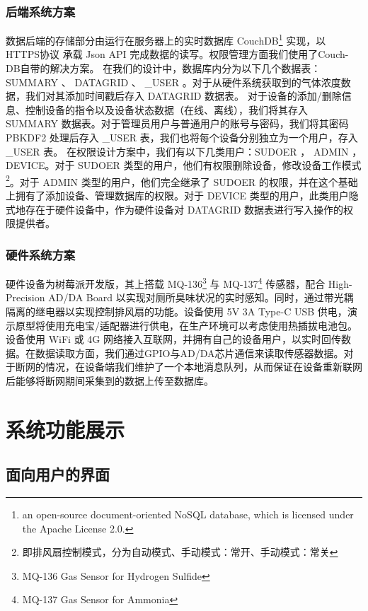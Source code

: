 \documentclass[degree=course]{sjtuthesis}
\begin{document}
\subsection{后端系统方案}
数据后端的存储部分由运行在服务器上的实时数据库 CouchDB\footnote{an open-source document-oriented NoSQL database, which is licensed under the Apache License 2.0.} 实现，以 HTTPS协议 承载 Json API 完成数据的读写。权限管理方面我们使用了Couch-DB自带的解决方案。
在我们的设计中，数据库内分为以下几个数据表： SUMMARY 、 DATAGRID 、 \_USER 。对于从硬件系统获取到的气体浓度数据，我们对其添加时间戳后存入 DATAGRID 数据表。 对于设备的添加/删除信息、控制设备的指令以及设备状态数据（在线、离线），我们将其存入 SUMMARY 数据表。对于管理员用户与普通用户的账号与密码，我们将其密码 PBKDF2 处理后存入 \_USER 表，我们也将每个设备分别独立为一个用户，存入 \_USER 表。
在权限设计方案中，我们有以下几类用户：SUDOER ， ADMIN ， DEVICE。对于 SUDOER 类型的用户，他们有权限删除设备，修改设备工作模式\footnote{即排风扇控制模式，分为自动模式、手动模式：常开、手动模式：常关}。对于 ADMIN 类型的用户，他们完全继承了 SUDOER 的权限，并在这个基础上拥有了添加设备、管理数据库的权限。对于 DEVICE 类型的用户，此类用户隐式地存在于硬件设备中，作为硬件设备对 DATAGRID 数据表进行写入操作的权限提供者。
\subsection{硬件系统方案}
硬件设备为树莓派开发版，其上搭载 MQ-136\footnote{MQ-136 Gas Sensor for Hydrogen Sulfide} 与 MQ-137\footnote{MQ-137 Gas Sensor for Ammonia} 传感器，配合 High-Precision AD/DA Board 以实现对厕所臭味状况的实时感知。同时，通过带光耦隔离的继电器以实现控制排风扇的功能。设备使用 5V 3A Type-C USB 供电，演示原型将使用充电宝/适配器进行供电，在生产环境可以考虑使用热插拔电池包。设备使用 WiFi 或 4G 网络接入互联网，并拥有自己的设备用户，以实时回传数据。在数据读取方面，我们通过GPIO与AD/DA芯片通信来读取传感器数据。对于断网的情况，在设备端我们维护了一个本地消息队列，从而保证在设备重新联网后能够将断网期间采集到的数据上传至数据库。


\chapter{系统功能展示}

\section{面向用户的界面}
\end{document}
